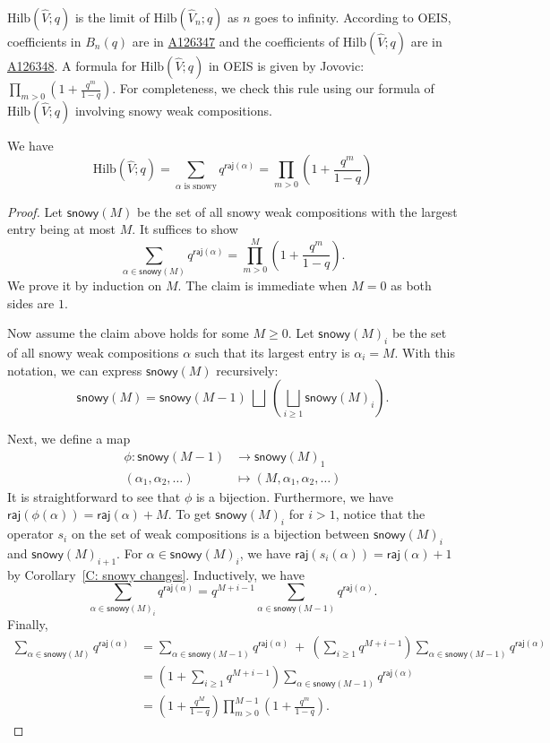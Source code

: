\documentclass[ALCO]{cedram}
\newcommand{\raj}{\mathsf{raj}}
\newcommand{\Hilb}{\mathrm{Hilb}}
\begin{document}
 $\Hilb(\widehat{V};q)$ is the limit of $\Hilb(\widehat{V}_n;q)$
as $n$ goes to infinity. 
According to OEIS, 
coefficients in $B_n(q)$ are in \href{https://oeis.org/A126347}{A126347} and 
the coefficients of $\Hilb(\widehat{V};q)$ are in \href{https://oeis.org/A126348}{A126348}. 
A formula for $\Hilb(\widehat{V};q)$ in OEIS is given by Jovovic: 
$\prod_{m > 0} (1 + \frac{q^m}{1 - q})$.
For completeness, we check this rule using our formula
of $\Hilb(\widehat{V};q)$ involving snowy weak compositions.

\begin{prop}\label{T: F}
We have
$$\Hilb(\widehat{V};q) = \sum_{\alpha \text{ is snowy}} q^{\raj(\alpha)}
= \prod_{m > 0} \left( 1 + \frac{q^m}{1 - q} \right)
$$
\end{prop}

\begin{proof}
Let $\mathsf{snowy}(M)$ be the set of all snowy weak compositions
with the largest entry being at most $M$.
It suffices to show 
$$ \sum_{\alpha \in \mathsf{snowy}(M)} q^{\raj(\alpha)}=\prod_{m  > 0}^M\left(1 + \frac{q^m}{1 - q}\right).$$ 
We prove it by induction on $M$. The claim is immediate when $M = 0$ as both sides are $1$.

Now assume the claim above holds for some $M\geq 0$.
Let $\mathsf{snowy}(M)_i$ be the set of all snowy weak compositions
$\alpha$ such that its largest entry is $\alpha_i = M$.
With this notation, we can express $\mathsf{snowy}(M)$ recursively:
$$\mathsf{snowy}(M) = \mathsf{snowy}(M-1) \:\bigsqcup\: \left( \bigsqcup_{i \geq 1} \mathsf{snowy}(M)_i\right).$$

Next, we define a map
\begin{align*}
    \phi: \mathsf{snowy}(M-1) &\to \mathsf{snowy}(M)_1 \\
    (\alpha_1, \alpha_2, \dots) &\mapsto (M, \alpha_1, \alpha_2, \dots)
\end{align*}
It is straightforward to see that $\phi$ is a bijection.
Furthermore, we have $\raj(\phi(\alpha)) = \raj(\alpha) + M$.
To get $\mathsf{snowy}(M)_i$ for $i>1$, notice that 
the operator $s_i$ on the set of weak compositions is a 
bijection between $\mathsf{snowy}(M)_i$
and $\mathsf{snowy}(M)_{i+1}$.
For $\alpha \in \mathsf{snowy}(M)_i$, we have
$\raj(s_i(\alpha)) = \raj(\alpha) + 1$ 
by Corollary~\ref{C: snowy changes}.
Inductively, we have
$$
\sum_{\alpha \in \mathsf{snowy}(M)_i} q^{\raj(\alpha)}
= q^{M+i - 1}\sum_{\alpha \in \mathsf{snowy}(M-1)} q^{\raj(\alpha)}.
$$
Finally, 
\begin{align*}
\sum_{\alpha \in \mathsf{snowy}(M)} q^{\raj(\alpha)} & =
\sum_{\alpha \in \mathsf{snowy}(M-1)} q^{\raj(\alpha)}
\:+\: \left(\sum_{i \geq 1}q^{M+i-1}\right) \sum_{\alpha \in \mathsf{snowy}(M-1)} q^{\raj(\alpha)}\\
& = 
\left(1 + \sum_{i \geq 1}q^{M+i-1} \right) \sum_{\alpha \in \mathsf{snowy}(M-1)} q^{\raj(\alpha)} \\
& = \left(1+\frac{q^M}{1-q}\right)\prod_{m  > 0}^{M-1}\left(1 + \frac{q^m}{1 - q}\right).
\end{align*}
\end{proof}
\end{document}
